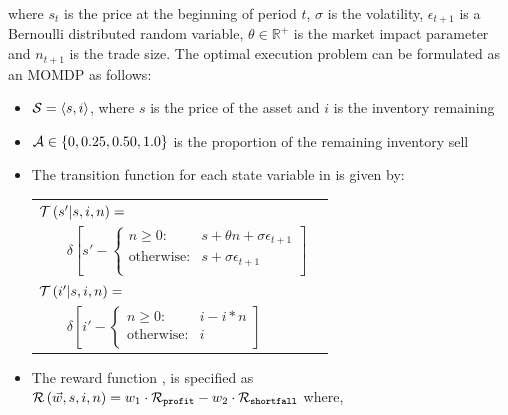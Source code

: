 where {\footnotesize $ s_t $ } is the price at the beginning of period {\footnotesize $ t $}, {\footnotesize $\sigma$} is the volatility, {\footnotesize $\epsilon_{t+1}$} is a Bernoulli distributed random variable, {\footnotesize $\theta \in \mathbb{R}^{+}$ } is the market impact parameter and {\footnotesize $n_{t + 1}$} is the trade size. The optimal execution problem can be formulated as an MOMDP as follows:
\begin{itemize}
    \item {\footnotesize $ \mathcal{S} = \left\langle s, i \right\rangle$}, where $ s $ is the price of the asset and $ i $ is the inventory remaining 
    \item {\footnotesize $ \mathcal{A} \in \left\lbrace 0, 0.25, 0.50, 1.0 \right\rbrace $} is the proportion of the remaining inventory sell
    \item The transition function {\footnotesize \Transition} for each state variable in {\footnotesize \State} is given by:    
    {\footnotesize 
        \abovedisplayskip=5pt
        \belowdisplayskip=0pt
        \renewcommand{\arraystretch}{1.5}
        \begin{tabular}{ll}
            $ \mathcal{T}\left( s' | s, i, n \right) = $ & $ $ \\
            $ \qquad \delta \left[ s' - \begin{cases}
            n \geq 0  : & s + \theta n + \sigma \epsilon_{t+1} \\
            \text{otherwise} : & s + \sigma \epsilon_{t+1} \\
            \end{cases} \right] $ & $ $\\            
            $ \mathcal{T}\left( i' | s, i, n \right) = $ & $ $ \\
            $ \qquad \delta \left[ i' - \begin{cases}
            n \geq 0 : & i - i * n \\
            \text{otherwise} : & i \\
            \end{cases} \right] $ & $ $\\
        \end{tabular}
    }%
    \item The reward function {\footnotesize \Reward}, is specified as {\footnotesize $ \mathcal{R}\left(\vec{w}, s, i, n \right) = w_1 \cdot \mathcal{R}_{\mathtt{profit}} - w_2 \cdot \mathcal{R}_{\mathtt{shortfall}} $} where, \\
    {\footnotesize 
}
\end{itemize}
